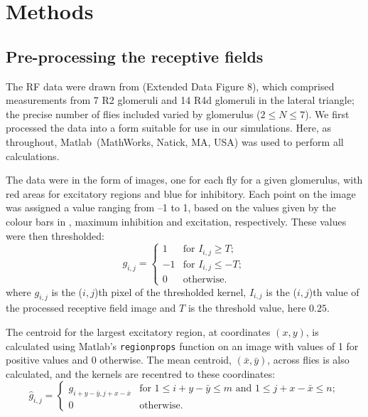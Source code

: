 
\section{Methods}
\subsection{Pre-processing the receptive fields}
\label{sec:methods:preprocessing}
The \ac{RF} data were drawn from \cite{Seelig2013} (Extended Data Figure 8), which comprised measurements from 7 R2 glomeruli and 14 R4d glomeruli in the lateral triangle; the precise number of flies included varied by glomerulus ($2\le N\le 7$).
We first processed the data into a form suitable for use in our simulations.
Here, as throughout, Matlab\textregistered\ (MathWorks, Natick, MA, USA) was used to perform all calculations.

The data were in the form of images, one for each fly for a given glomerulus, with red areas for excitatory regions and blue for inhibitory.
Each point on the image was assigned a value ranging from --1 to 1, based on the values given by the colour bars in \cite{Seelig2013}, maximum inhibition and excitation, respectively.
These values were then thresholded:
$$
g_{i,j} = \left\{ \begin{array}{rl}
		   1 & \mbox{for } I_{i,j} \ge T; \\
                   -1 & \mbox{for } I_{i,j} \le -T; \\
                   0 & \mbox{otherwise.}
                  \end{array}
          \right.
$$
where $g_{i,j}$ is the ($i,j$)th pixel of the thresholded kernel, $I_{i,j}$ is the ($i,j$)th value of the processed receptive field image and $T$ is the threshold value, here $0.25$.

The centroid for the largest excitatory region, at coordinates $(x,y)$, is calculated using Matlab's \texttt{regionprops} function on an image with values of 1 for positive values and 0 otherwise.
The mean centroid, $(\bar{x},\bar{y})$, across flies is also calculated, and the kernels are recentred to these coordinates:
$$
\hat{g}_{i,j} = \left\{ \begin{array}{ll} g_{i+y-\bar{y},j+x-\bar{x}} & \mbox{for } 1\le i+y-\bar{y}\le m \mbox{ and } 1\le j+x-\bar{x}\le n;\\
0 & \mbox{otherwise.} \end{array} \right.
$$

